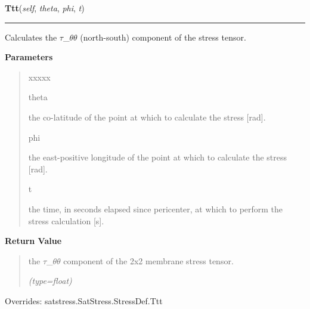     \vspace{0.5ex}

\hspace{.8\funcindent}\begin{boxedminipage}{\funcwidth}

    \raggedright \textbf{Ttt}(\textit{self}, \textit{theta}, \textit{phi}, \textit{t})

    \vspace{-1.5ex}

    \rule{\textwidth}{0.5\fboxrule}
\setlength{\parskip}{2ex}
    Calculates the \(\tau\)\_\(\theta\)\(\theta\) (north-south) component 
    of the stress tensor.

\setlength{\parskip}{1ex}
      \textbf{Parameters}
      \vspace{-1ex}

      \begin{quote}
        \begin{Ventry}{xxxxx}

          \item[theta]

          the co-latitude of the point at which to calculate the stress 
          [rad].

          \item[phi]

          the east-positive longitude of the point at which to calculate 
          the stress [rad].

          \item[t]

          the time, in seconds elapsed since pericenter, at which to 
          perform the stress calculation [s].

        \end{Ventry}

      \end{quote}

      \textbf{Return Value}
    \vspace{-1ex}

      \begin{quote}
      the \(\tau\)\_\(\theta\)\(\theta\) component of the 2x2 membrane 
      stress tensor.

      {\it (type=float)}

      \end{quote}

      Overrides: satstress.SatStress.StressDef.Ttt

    \end{boxedminipage}

